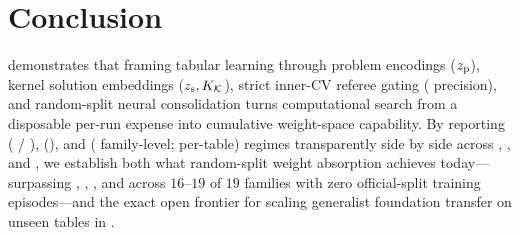 \section{Conclusion}
\label{sec:conclusion}

\EZ{} demonstrates that framing tabular learning through problem encodings ($z_{\mathrm{p}}$), kernel solution embeddings ($z_{\mathrm{s}}, K_{\mathcal{K}}$), strict inner-CV referee gating (\BHKernelGatePrec{} precision), and random-split neural consolidation turns computational search from a disposable per-run expense into cumulative weight-space capability. By reporting \regfair{} (\BHEloFairReg{} / \BHEloFairAdaptive{}), \regincorpus{} (\BHEloInCorpus{}), and \regrecall{} (\BHEloRecall{} family-level; \BHEloGenTwoA{} per-table) regimes transparently side by side across , , and , we establish both what random-split weight absorption achieves today---surpassing , , , and  across $16$--$19$ of $19$  families with zero official-split training episodes---and the exact open frontier for scaling generalist foundation transfer on unseen tables in .
